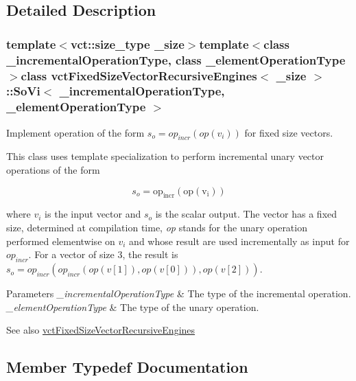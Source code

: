 \subsection{Detailed Description}
\subsubsection*{template$<$vct\+::size\+\_\+type \+\_\+size$>$template$<$class \+\_\+incremental\+Operation\+Type, class \+\_\+element\+Operation\+Type$>$class vct\+Fixed\+Size\+Vector\+Recursive\+Engines$<$ \+\_\+size $>$\+::\+So\+Vi$<$ \+\_\+incremental\+Operation\+Type, \+\_\+element\+Operation\+Type $>$}

Implement operation of the form $s_o = op_{incr}(op(v_i))$ for fixed size vectors. 

This class uses template specialization to perform incremental unary vector operations of the form

\[ s_o = \mathrm{op_{incr}(\mathrm{op}(v_i))} \]

where $v_i$ is the input vector and $s_o$ is the scalar output. The vector has a fixed size, determined at compilation time, {\itshape op} stands for the unary operation performed elementwise on $v_i$ and whose result are used incrementally as input for $op_{incr}$. For a vector of size 3, the result is $s_o = op_{incr}(op_{incr}(op(v[1]), op(v[0])), op(v[2])) $.


\begin{DoxyParams}{Parameters}
{\em \+\_\+incremental\+Operation\+Type} & The type of the incremental operation.\\
\hline
{\em \+\_\+element\+Operation\+Type} & The type of the unary operation.\\
\hline
\end{DoxyParams}
\begin{DoxySeeAlso}{See also}
\hyperlink{classvct_fixed_size_vector_recursive_engines}{vct\+Fixed\+Size\+Vector\+Recursive\+Engines} 
\end{DoxySeeAlso}


\subsection{Member Typedef Documentation}
\hypertarget{classvct_fixed_size_vector_recursive_engines_1_1_so_vi_ae988d4e7479fa6cd314b1103f6a9aeab}{}

